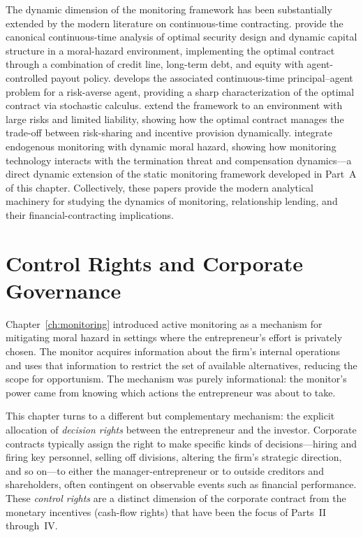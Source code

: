 \documentclass[11pt,a4paper,oneside]{book}
\theoremstyle{plain}
\theoremstyle{definition}
\theoremstyle{remark}
\numberwithin{equation}{chapter}
\begin{document}
The dynamic dimension of the monitoring framework has been substantially extended by the modern literature on continuous-time contracting.
\citet{DeMarzoSannikov2006} provide the canonical continuous-time analysis of optimal security design and dynamic capital structure in a moral-hazard environment, implementing the optimal contract through a combination of credit line, long-term debt, and equity with agent-controlled payout policy.
\citet{Sannikov2008} develops the associated continuous-time principal--agent problem for a risk-averse agent, providing a sharp characterization of the optimal contract via stochastic calculus.
\citet{BiaisMariottiRochetVilleneuve2010} extend the framework to an environment with large risks and limited liability, showing how the optimal contract manages the trade-off between risk-sharing and incentive provision dynamically.
\citet{PiskorskiWesterfield2016} integrate endogenous monitoring with dynamic moral hazard, showing how monitoring technology interacts with the termination threat and compensation dynamics---a direct dynamic extension of the static monitoring framework developed in Part~A of this chapter.
Collectively, these papers provide the modern analytical machinery for studying the dynamics of monitoring, relationship lending, and their financial-contracting implications.

\chapter{Control Rights and Corporate Governance}
\label{ch:control}

Chapter~\ref{ch:monitoring} introduced active monitoring as a mechanism for mitigating moral hazard in settings where the entrepreneur's effort is privately chosen.
The monitor acquires information about the firm's internal operations and uses that information to restrict the set of available alternatives, reducing the scope for opportunism.
The mechanism was purely informational: the monitor's power came from knowing which actions the entrepreneur was about to take.

This chapter turns to a different but complementary mechanism: the explicit allocation of \emph{decision rights} between the entrepreneur and the investor.
Corporate contracts typically assign the right to make specific kinds of decisions---hiring and firing key personnel, selling off divisions, altering the firm's strategic direction, and so on---to either the manager-entrepreneur or to outside creditors and shareholders, often contingent on observable events such as financial performance.
These \emph{control rights} are a distinct dimension of the corporate contract from the monetary incentives (cash-flow rights) that have been the focus of Parts~II through~IV.
\end{document}
